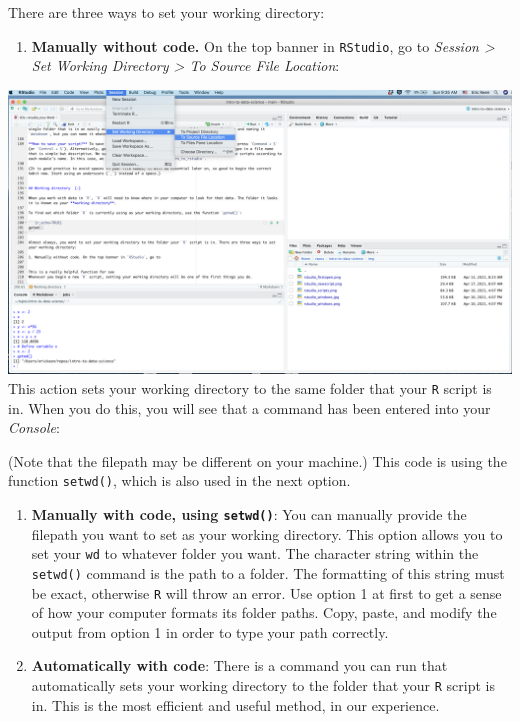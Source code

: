 \documentclass[
]{book}
\providecommand{\tightlist}{%
  \setlength{\itemsep}{0pt}\setlength{\parskip}{0pt}}
\begin{document}
There are three ways to set your working directory:

\begin{enumerate}
\def\labelenumi{\arabic{enumi}.}
\tightlist
\item
  \textbf{Manually without code.} On the top banner in \texttt{RStudio}, go to \emph{Session \textgreater{} Set Working Directory \textgreater{} To Source File Location}:
\end{enumerate}

\includegraphics{img/rstudio_setwd.png}
This action sets your working directory to the same folder that your \texttt{R} script is in. When you do this, you will see that a command has been entered into your \emph{Console}:

(Note that the filepath may be different on your machine.) This code is using the function \texttt{setwd()}, which is also used in the next option.

\begin{enumerate}
\def\labelenumi{\arabic{enumi}.}
\setcounter{enumi}{1}
\item
  \textbf{Manually with code, using \texttt{setwd()}}: You can manually provide the filepath you want to set as your working directory. This option allows you to set your \texttt{wd} to whatever folder you want. The character string within the \texttt{setwd()} command is the path to a folder. The formatting of this string must be exact, otherwise \texttt{R} will throw an error. Use option 1 at first to get a sense of how your computer formats its folder paths. Copy, paste, and modify the output from option 1 in order to type your path correctly.
\item
  \textbf{Automatically with code}: There is a command you can run that automatically sets your working directory to the folder that your \texttt{R} script is in. This is the most efficient and useful method, in our experience.
\end{enumerate}
\end{document}
